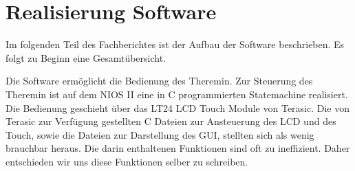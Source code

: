 \clearpage
\section{Realisierung Software}\label{sec:Realisierung_Software}
Im folgenden Teil des Fachberichtes ist der Aufbau der Software beschrieben. Es folgt zu Beginn eine Gesamtübersicht.

Die Software ermöglicht die Bedienung des Theremin. Zur Steuerung des Theremin ist auf dem NIOS II eine in C programmierten Statemachine realisiert. Die Bedienung geschieht über das LT24 LCD Touch Module von Terasic. Die von Terasic zur Verfügung gestellten C Dateien zur Ansteuerung des LCD und des Touch, sowie die Dateien zur Darstellung des GUI, stellten sich als wenig brauchbar heraus. Die darin enthaltenen Funktionen sind oft zu ineffizient. Daher entschieden wir uns diese Funktionen selber zu schreiben.
